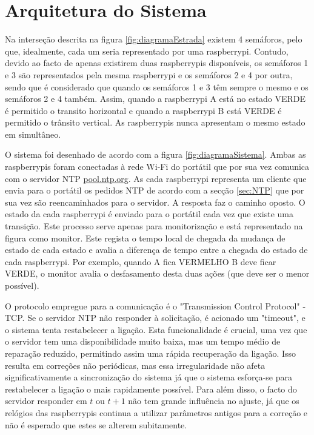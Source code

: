 \section{Arquitetura do Sistema}

    Na interseção descrita na figura \ref{fig:diagramaEstrada} existem 4 semáforos, pelo que, idealmente, cada um seria representado por uma raspberrypi. Contudo, devido ao facto de apenas existirem duas raspberrypis disponíveis, os semáforos 1 e 3 são representados pela mesma raspberrypi e os semáforos 2 e 4 por outra, sendo que é considerado que quando os semáforos 1 e 3 têm sempre o mesmo e os semáforos 2 e 4 também. Assim, quando a raspberrypi A está no estado VERDE é permitido o transito horizontal e quando a raspberrypi B está VERDE é permitido o trânsito vertical. As raspberrypis nunca apresentam o mesmo estado em simultâneo. 

    O sistema foi desenhado de acordo com a figura \ref{fig:diagramaSistema}. Ambas as raspberrypis foram conectadas à rede Wi-Fi do portátil que por sua vez comunica com o servidor NTP \url{pool.ntp.org}. As cada raspberrypi representa um cliente que envia para o portátil os pedidos NTP de acordo com a secção \ref{sec:NTP} que por sua vez são reencaminhados para o servidor. A resposta faz o caminho oposto.
    O estado da cada raspberrypi é enviado para o portátil cada vez que existe uma transição. Este processo serve apenas para monitorização e está representado na figura como monitor. Este regista o tempo local de chegada da mudança de estado de cada estado e avalia a diferença de tempo entre a chegada do estado de cada raspberrypi. Por exemplo, quando A fica VERMELHO B deve ficar VERDE, o monitor avalia o desfasamento desta duas ações (que deve ser o menor possível).

    O protocolo empregue para a comunicação é o "Transmission Control Protocol" - TCP. Se o servidor NTP não responder à solicitação, é acionado um "timeout", e o sistema tenta restabelecer a ligação. Esta funcionalidade é crucial, uma vez que o servidor tem uma disponibilidade muito baixa, mas um tempo médio de reparação reduzido, permitindo assim uma rápida recuperação da ligação. Isso resulta em correções não periódicas, mas essa irregularidade não afeta significativamente a sincronização do sistema já que o sistema esforça-se para restabelecer a ligação o mais rapidamente possível. Para além disso, o facto do servidor responder em $t$ ou $t + 1$ não tem grande influência no ajuste, já que os relógios das raspberrypis continua a utilizar parâmetros antigos para a correção e não é esperado que estes se alterem subitamente.


